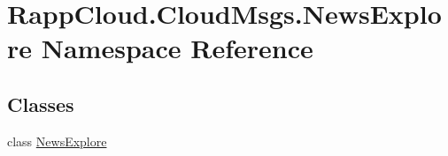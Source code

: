 \hypertarget{namespaceRappCloud_1_1CloudMsgs_1_1NewsExplore}{\section{Rapp\-Cloud.\-Cloud\-Msgs.\-News\-Explore Namespace Reference}
\label{namespaceRappCloud_1_1CloudMsgs_1_1NewsExplore}
}
\subsection*{Classes}
\begin{DoxyCompactItemize}
\item 
class \hyperlink{classRappCloud_1_1CloudMsgs_1_1NewsExplore_1_1NewsExplore}{News\-Explore}
\end{DoxyCompactItemize}
